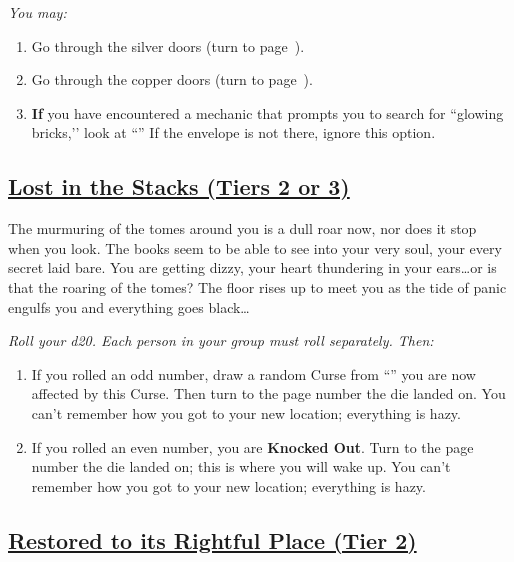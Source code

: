 \documentclass[sheet]{GL2020}
\begin{document}
\vspace{0.5cm}

\begingroup
\itshape
You may:
\begin{enumerate}[A]
  \item Go through the silver doors (turn to page~\pageref{SlowBoatDarkRiver}).
	\item Go through the copper doors (turn to page~\pageref{ToweringTree}).
	\item \textbf{If} you have encountered a mechanic that prompts you to search for ``glowing bricks,’’ look at ``\sBlueBrickTwelveEnvelope{}'' If the envelope is not there, ignore this option.
\end{enumerate}
\endgroup

\clearpage

\begin{center}\section*{\underline{Lost in the Stacks (Tiers 2 or 3)}}\end{center}
\label{LostintheStacks}

The murmuring of the tomes around you is a dull roar now, nor does it stop when you look. The books seem to be able to see into your very soul, your every secret laid bare. You are getting dizzy, your heart thundering in your ears\ldots or is that the roaring of the tomes? The floor rises up to meet you as the tide of panic engulfs you and everything goes black\ldots{}


\vspace{0.5cm}

\begingroup
\itshape
Roll your d20. Each person in your group must roll separately. Then:
\begin{enumerate}[A]
  \item If you rolled an odd number, draw a random Curse from ``\sCursedCodicesEnvelope{}'' you are now affected by this Curse. Then turn to the page number the die landed on. You can’t remember how you got to your new location; everything is hazy. 
	\item If you rolled an even number, you are \textbf{Knocked Out}. Turn to the page number the die landed on; this is where you will wake up. You can’t remember how you got to your new location; everything is hazy.
\end{enumerate}
\endgroup

\clearpage

\begin{center}\section*{\underline{Restored to its Rightful Place (Tier 2)}}\end{center}
\label{RestoredRightfulPlace}
\end{document}
